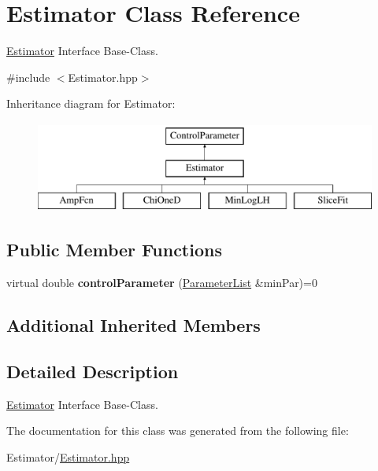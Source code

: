\hypertarget{class_estimator}{\section{Estimator Class Reference}
\label{class_estimator}
}


\hyperlink{class_estimator}{Estimator} Interface Base-\/\-Class.  




{\ttfamily \#include $<$Estimator.\-hpp$>$}

Inheritance diagram for Estimator\-:\begin{figure}[H]
\begin{center}
\leavevmode
\includegraphics[height=3.000000cm]{class_estimator}
\end{center}
\end{figure}
\subsection*{Public Member Functions}
\begin{DoxyCompactItemize}
\item 
\hypertarget{class_estimator_a7546c738e4ec8709082390c7edbc0cb3}{virtual double {\bfseries control\-Parameter} (\hyperlink{class_parameter_list}{Parameter\-List} \&min\-Par)=0}\label{class_estimator_a7546c738e4ec8709082390c7edbc0cb3}

\end{DoxyCompactItemize}
\subsection*{Additional Inherited Members}


\subsection{Detailed Description}
\hyperlink{class_estimator}{Estimator} Interface Base-\/\-Class. 

The documentation for this class was generated from the following file\-:\begin{DoxyCompactItemize}
\item 
Estimator/\hyperlink{_estimator_8hpp}{Estimator.\-hpp}\end{DoxyCompactItemize}
